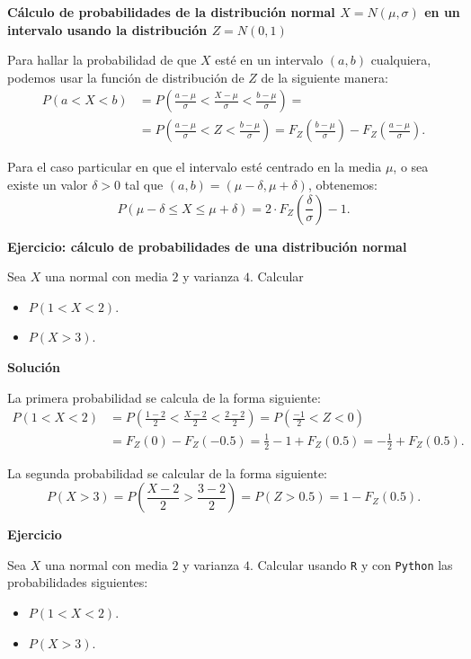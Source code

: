 \documentclass[
  letterpaper,
  DIV=11,
  numbers=noendperiod]{scrreprt}
\providecommand{\tightlist}{%
  \setlength{\itemsep}{0pt}\setlength{\parskip}{0pt}}\usepackage{longtable,booktabs,array}
\begin{document}
\textbf{Cálculo de probabilidades de la distribución normal
\(X=N(\mu,\sigma)\) en un intervalo usando la distribución \(Z=N(0,1)\)}

Para hallar la probabilidad de que \(X\) esté en un intervalo \((a,b)\)
cualquiera, podemos usar la función de distribución de \(Z\) de la
siguiente manera: \[
\begin{array}{ll}
P(a<X<b)&=P\left(\frac{a-\mu}{\sigma}<\frac{X-\mu}{\sigma}<\frac{b-\mu}{\sigma}\right)= \\
&=P\left(\frac{a-\mu}{\sigma}<Z<\frac{b-\mu}{\sigma}\right)=F_{Z}\left(\frac{b-\mu}{\sigma}\right)-
F_{Z}\left(\frac{a-\mu}{\sigma}\right).
\end{array}
\]

Para el caso particular en que el intervalo esté centrado en la media
\(\mu\), o sea existe un valor \(\delta>0\) tal que
\((a,b)=(\mu-\delta,\mu+\delta)\), obtenemos: \[
P\left(\mu-\delta\leq X \leq\mu+\delta\right)=2\cdot  F_Z\left(\frac{\delta}{\sigma}\right)-1.
\]

\textbf{Ejercicio: cálculo de probabilidades de una distribución normal}

Sea \(X\) una normal con media \(2\) y varianza \(4\). Calcular

\begin{itemize}
\tightlist
\item
  \(P(1< X< 2).\)
\item
  \(P(X>3).\)
\end{itemize}

\textbf{Solución}

La primera probabilidad se calcula de la forma siguiente: \[
\begin{array}{ll}
P(1< X< 2)&= P\left(\frac{1-2}{2}<\frac{X-2}{2}<\frac{2-2}{2}\right)= P\left(\frac{-1}{2}<Z<0\right)\\
&= F_{Z}(0)-F_{Z}(-0.5)=\frac12-1+F_{Z}(0.5)=-\frac12+F_Z(0.5).
\end{array}
\]

La segunda probabilidad se calcular de la forma siguiente: \[
P(X>3)=P\left(\frac{X-2}2>\frac{3-2}{2}\right)=P(Z>0.5)=1-F_{Z}(0.5).
\]

\textbf{Ejercicio}

Sea \(X\) una normal con media \(2\) y varianza \(4\). Calcular usando
\texttt{R} y con \texttt{Python} las probabilidades siguientes:

\begin{itemize}
\tightlist
\item
  \(P(1< X< 2).\)
\item
  \(P(X>3).\)
\end{itemize}
\end{document}
